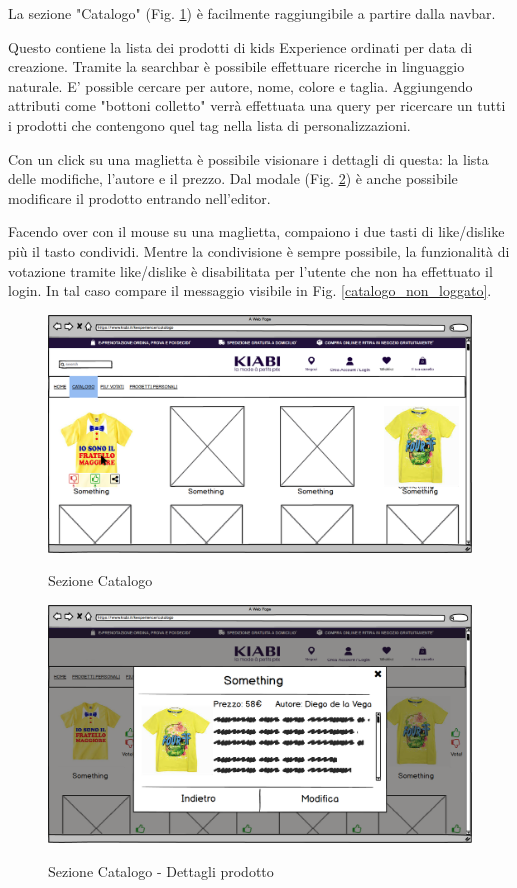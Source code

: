 \documentclass[12pt,italian,]{report}
\begin{document}
La sezione "Catalogo" (Fig. \ref{catalogo}) è facilmente raggiungibile a partire dalla navbar.

Questo contiene la lista dei prodotti di kids Experience ordinati per data di creazione. Tramite la searchbar è possibile effettuare ricerche in linguaggio naturale. E' possible cercare per autore, nome, colore e taglia. Aggiungendo attributi come "bottoni colletto" verrà effettuata una query per ricercare un tutti i prodotti che contengono quel tag nella lista di personalizzazioni.

Con un click su una maglietta è possibile visionare i dettagli di questa: la lista delle modifiche, l'autore e il prezzo. Dal modale (Fig. \ref{catalogo_dettagli}) è anche possibile modificare il prodotto entrando nell'editor.

Facendo over con il mouse su una maglietta, compaiono i due tasti di like/dislike più il tasto condividi. Mentre la condivisione è sempre possibile, la funzionalità di votazione tramite like/dislike è disabilitata per l'utente che non ha effettuato il login. In tal caso compare il messaggio visibile in Fig. \ref{catalogo_non_loggato}.


\begin{figure}[h]
\centering
\includegraphics{balsamiq/Catalogo.png}
\label{catalogo}
\caption{Sezione Catalogo}
\end{figure}

\begin{figure}[h]
\centering
\includegraphics{balsamiq/Catalogo details.png}
\label{catalogo_dettagli}
\caption{Sezione Catalogo - Dettagli prodotto}
\end{figure}
\end{document}
